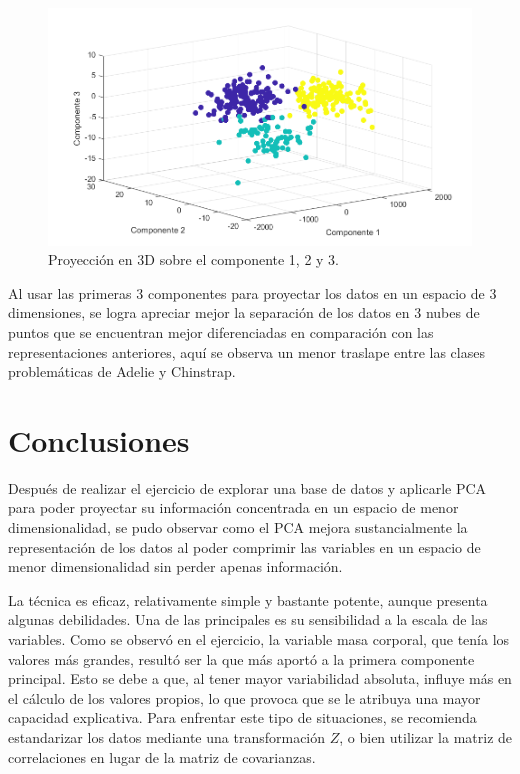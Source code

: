 \documentclass[11pt, letterpaper]{article}
\begin{document}
\begin{figure}[h!]
	\centering
	\begin{minipage}{1.1\textwidth}
		\centering
		\includegraphics[width=\textwidth]{IMG/G5.png}
		\caption{Proyección en 3D sobre el componente 1, 2 y 3.}
		\label{fig:f7}
	\end{minipage}\hfill
\end{figure}

Al usar las primeras 3 componentes para proyectar los datos en un espacio de 3 dimensiones, se logra apreciar mejor la separación de los datos en 3 nubes de puntos que se encuentran mejor diferenciadas en comparación con las representaciones anteriores, aquí se observa un menor traslape entre las clases problemáticas de Adelie y Chinstrap. 


\newpage
	
\section{Conclusiones}
	
Después de realizar el ejercicio de explorar una base de datos y aplicarle PCA para poder proyectar su información concentrada en un espacio de menor dimensionalidad, se pudo observar como el PCA mejora sustancialmente la representación de los datos al poder comprimir las variables en un espacio de menor dimensionalidad sin perder apenas información.

La técnica es eficaz, relativamente simple y bastante potente, aunque presenta algunas debilidades. Una de las principales es su sensibilidad a la escala de las variables. Como se observó en el ejercicio, la variable masa corporal, que tenía los valores más grandes, resultó ser la que más aportó a la primera componente principal. Esto se debe a que, al tener mayor variabilidad absoluta, influye más en el cálculo de los valores propios, lo que provoca que se le atribuya una mayor capacidad explicativa. Para enfrentar este tipo de situaciones, se recomienda estandarizar los datos mediante una transformación $Z$, o bien utilizar la matriz de correlaciones en lugar de la matriz de covarianzas.
\end{document}
